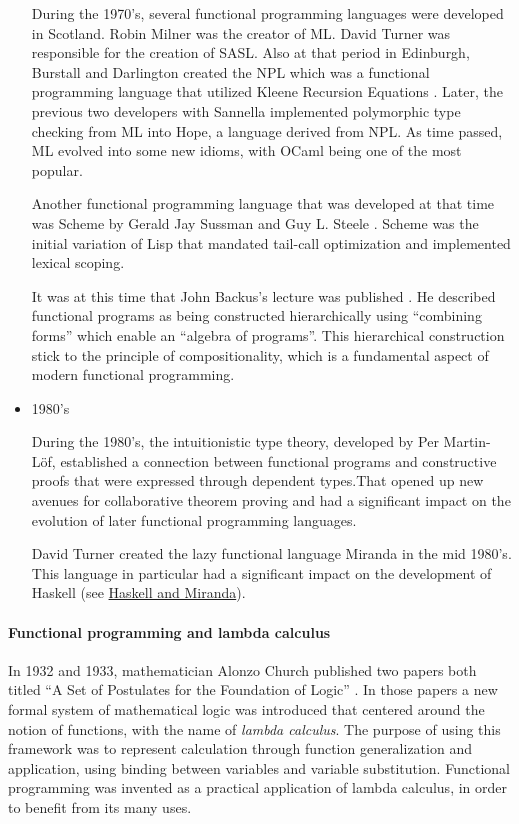 \documentclass[a4paper, titlepage, twoside]{article}
\begin{document}
\begin{itemize}
During the 1970's, several functional programming languages were developed in Scotland. Robin Milner was the creator of ML. David Turner was responsible for the creation of SASL. Also at that period in Edinburgh, Burstall and Darlington created the NPL which was a functional programming language that utilized Kleene Recursion Equations \autocite{darlingtonProgramTransformationSynthesis1977}. Later, the previous two developers with Sannella implemented polymorphic type checking from ML into Hope, a language derived from NPL. As time passed, ML evolved into some new idioms, with OCaml being one of the most popular.

Another functional programming language that was developed at that time was Scheme by Gerald Jay Sussman and Guy L. Steele \autocite{abelsonRevisedReportAlgorithmic1998}. Scheme was the initial variation of Lisp that mandated tail-call optimization and implemented lexical scoping.

It was at this time that John Backus's lecture was published \autocite{backusCanProgrammingBe1978}. He described functional programs as being constructed hierarchically using ``combining forms'' which enable an ``algebra of programs''. This hierarchical construction stick to the principle of compositionality, which is a fundamental aspect of modern functional programming.

\item 1980's

During the 1980's, the intuitionistic type theory, developed by Per Martin-Löf, established a connection between functional programs and constructive proofs that were expressed through dependent types.That opened up new avenues for collaborative theorem proving and had a significant impact on the evolution of later functional programming languages.

David Turner created the lazy functional language Miranda \autocite{turnerMirandaNonstrictFunctional1985} in the mid 1980's. This language in particular had a significant impact on the development of Haskell (see \hyperref[sec:org8e9c48b]{Haskell and Miranda}).
\end{itemize}

\paragraph*{Functional programming and lambda calculus}
\label{sec:org1feda20}

In 1932 and 1933, mathematician Alonzo Church published two papers both titled ``A Set of Postulates for the Foundation of Logic'' \autocite{churchSetPostulatesFoundation1932,churchSetPostulatesFoundation1933}. In those papers a new formal system of mathematical logic was introduced that centered around the notion of functions, with the name of \emph{lambda calculus}. The purpose of using this framework was to represent calculation through function generalization and application, using binding between variables and variable substitution. Functional programming was invented as a practical application of lambda calculus, in order to benefit from its many uses.
\end{document}
